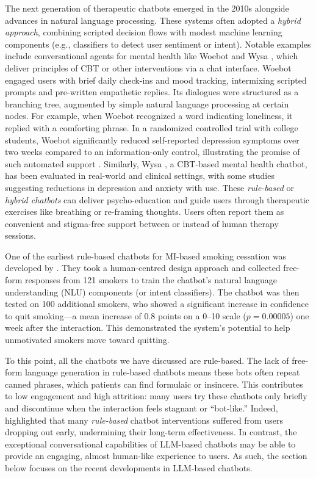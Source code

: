 The next generation of therapeutic chatbots emerged in the 2010s alongside advances in
natural language processing. These systems often adopted a \emph{hybrid approach},
combining scripted decision flows with modest machine learning components (e.g.,
classifiers to detect user sentiment or intent). Notable examples include
conversational agents for mental health like Woebot \cite{Fitzpatrick2017} and Wysa
\cite{Chang2024}, which deliver principles of CBT or other interventions via a chat
interface. Woebot engaged users with brief daily check-ins and mood tracking,
intermixing scripted prompts and pre-written empathetic replies. Its dialogues were
structured as a branching tree, augmented by simple natural language processing at
certain nodes. For example, when Woebot recognized a word indicating loneliness, it
replied with a comforting phrase. In a randomized controlled trial with college
students, Woebot significantly reduced self-reported depression symptoms over two weeks
compared to an information-only control, illustrating the promise of such automated
support \cite{Fitzpatrick2017}. Similarly, Wysa \cite{Chang2024}, a CBT-based mental
health chatbot, has been evaluated in real-world and clinical settings, with some
studies suggesting reductions in depression and anxiety with use. These
\emph{rule-based} or \emph{hybrid chatbots} can deliver psycho-education and guide
users through therapeutic exercises like breathing or re-framing thoughts. Users often
report them as convenient and stigma-free support between or instead of human therapy
sessions.

One of the earliest rule-based chatbots for MI-based smoking cessation was developed by
\citet{Almusharraf_2019}. They took a human-centred design approach and collected
free-form responses from 121 smokers to train the chatbot's natural language
understanding (NLU) components (or intent classifiers). The chatbot was then tested on
100 additional smokers, who showed a significant increase in confidence to quit
smoking---a mean increase of 0.8 points on a 0–10 scale ($p=0.00005$) one week after
the interaction. This demonstrated the system's potential to help unmotivated smokers
move toward quitting.

To this point, all the chatbots we have discussed are rule-based. The lack of free-form
language generation in rule-based chatbots means these bots often repeat canned
phrases, which patients can find formulaic or insincere. This contributes to low
engagement and high attrition: many users try these chatbots only briefly and
discontinue when the interaction feels stagnant or ``bot-like.'' Indeed,
\citet{LIMPANOPPARAT2024100081} highlighted that many \emph{rule-based} chatbot
interventions suffered from users dropping out early, undermining their long-term
effectiveness. In contrast, the exceptional conversational capabilities of LLM-based
chatbots may be able to provide an engaging, almost human-like experience to users. As
such, the section below focuses on the recent developments in LLM-based chatbots.

